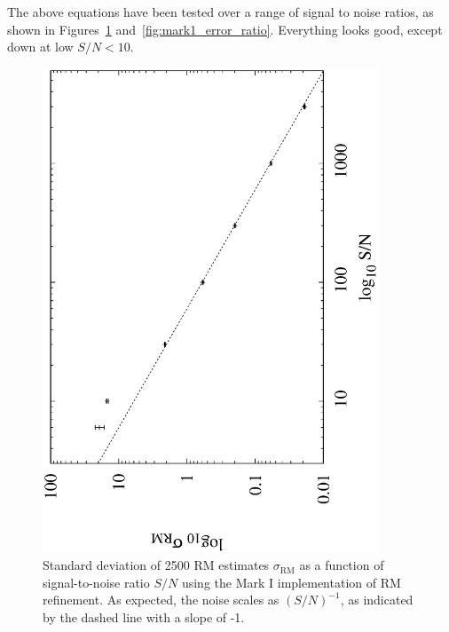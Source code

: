 \documentclass[12pt]{article}
\begin{document}
The above equations have been tested over a range of signal to noise ratios, as shown in 
Figures~\ref{fig:mark1_error} and~\ref{fig:mark1_error_ratio}.  Everything looks good, except
down at low $S/N < 10$.

\begin{figure}
\centerline{\includegraphics[angle=-90,width=100mm]{plots/mark1_error.eps}}
\caption{\label{fig:mark1_error}
Standard deviation of 2500 RM estimates $\sigma_\mathrm{RM}$ as a function of signal-to-noise ratio $S/N$
using the Mark I implementation of RM refinement.  As expected, the noise scales as $(S/N)^{-1}$, as indicated
by the dashed line with a slope of -1.}
\end{figure}
\end{document}
